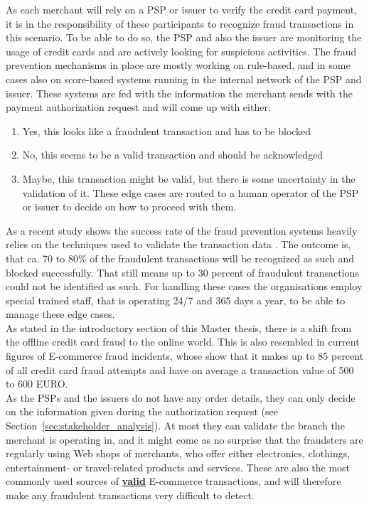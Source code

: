 As each merchant will rely on a \gls{PSP} or issuer to verify the credit card payment, it is in the responsibility of these participants to recognize fraud transactions in this scenario. To be able to do so, the \gls{PSP} and also the issuer are monitoring the usage of credit cards and are actively looking for suspicious activities. The fraud prevention mechanisms in place are mostly working on rule-based, and in some cases also on score-based systems running in the internal network of the \gls{PSP} and issuer. These systems are fed with the information the merchant sends with the payment authorization request and will come up with either:\@

\begin{enumerate}
  \item Yes, this looks like a fraudulent transaction and has to be blocked
  \item No, this seems to be a valid transaction and should be acknowledged
  \item Maybe, this transaction might be valid, but there is some uncertainty in the validation of it. These edge cases are routed to a human operator of the \gls{PSP} or issuer to decide on how to proceed with them.
\end{enumerate}

As a recent study shows the success rate of the fraud prevention systems heavily relies on the techniques used to validate the transaction data \citep{rana2015survey}. The outcome is, that ca. 70 to 80\% of the fraudulent transactions will be recognized as such and blocked successfully. That still means up to 30 percent of fraudulent transactions could not be identified as such. For handling these cases the organisations employ special trained staff, that is operating 24/7 and 365 days a year, to be able to manage these edge cases. \\

As stated in the introductory section of this Master thesis, there is a shift from the offline credit card fraud to the online world. This is also resembled in current figures of \gls{E-commerce} fraud incidents, whose show that it makes up to 85 percent of all credit card fraud attempts and have on average a transaction value of 500 to 600 EURO.\\

As the \gls{PSP}s and the issuers do not have any order details, they can only decide on the information given during the authorization request (see Section~\ref{sec:stakeholder_analysis}). At most they can validate the branch the merchant is operating in, and it might come as no surprise that the fraudsters are regularly using Web shops of merchants, who offer either electronics, clothings, entertainment- or travel-related products and services. These are also the most commonly used sources of \textbf{\underline{valid}} \gls{E-commerce} transactions, and will therefore make any fraudulent transactions very difficult to detect. \\

